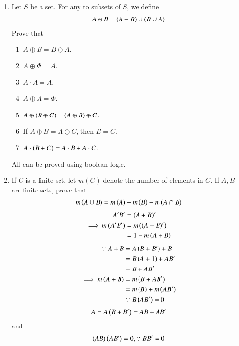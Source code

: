 \begin{enumerate}[label=\arabic*.,ref=\thesubsection.\theenumi]
\begin{enumerate}
\end{enumerate}
\item Let $S$ be a set.  For any to subsets of $S$, we define 
		\begin{align}
			A \oplus B = \left(A-B\right)\cup \left(B\cup A\right)
		\end{align}
		Prove that
\begin{enumerate}
	\item $A \oplus B = B \oplus A $.
	\item $A \oplus \Phi = A $.
	\item $A\cdot A = A $.
	\item $A \oplus A = \Phi $.
	\item $A \oplus \left(B \oplus C\right) = \left(A \oplus B\right) \oplus C $.
	\item If $A \oplus B = A \oplus C$, then $B = C$.
	\item $A\cdot \left(B+C\right) = A\cdot B + A \cdot C $.
\end{enumerate}
\solution All can be proved using boolean logic.
\item If $C$ is a finite set, let $m(C)$ denote the number of elements in $C$.  If $A, B$ are finite sets, 
	prove that 
		\begin{align}
			m\left(A \cup B\right) = m\left(A\right) + m \left(B\right) -m\left(A\cap B\right)
		\end{align}
		\solution 
		\begin{align}
A^{\prime}B^{\prime} &=  \left(A+B\right)^{\prime}
\\
\implies m\left(A^{\prime}B^{\prime}\right) &=  m\left(\left(A+B\right)^{\prime}\right) 
\\
&= 1 - m\left(A+B\right) 
\label{eq:axiom_sum_one}
\end{align}
\begin{align}
\because A+B &= A\left(B+B^{\prime}\right) + B
\\
&= B \left(A +1\right) + A B^{\prime}
\\
&=B + A B^{\prime}
\\
\implies m\left(A+B\right) &= m\left(B + A B^{\prime} \right)
\\
&=m\left(B\right)+m\left( A B^{\prime} \right) 
\\
&\because B \left( A B^{\prime} \right) = 0
\label{eq:axiom_sum_two}
\end{align}
\begin{align}
A = A \left(B+B^{\prime}\right) =  AB + AB^{\prime}
\label{eq:axiom_sum_A}
\end{align}
and 
\begin{align}
\brak{ AB}\brak{  AB^{\prime}} = 0, \because BB^{\prime} = 0

\end{align}
\end{enumerate}

